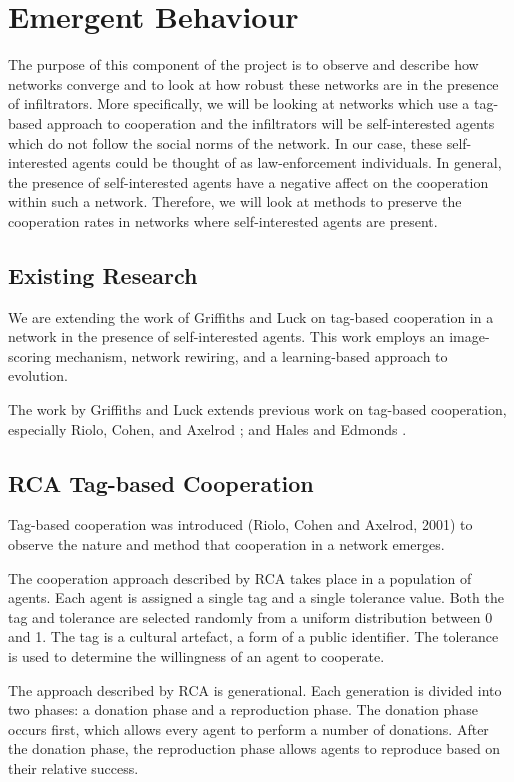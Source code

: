 \section{Emergent Behaviour}

The purpose of this component of the project is to observe and
describe how networks converge and to look at how robust these
networks are in the presence of infiltrators.  More specifically,
we will be looking at networks which use a tag-based approach to
cooperation and the infiltrators will be self-interested agents
which do not follow the social norms of the network.  In our case,
these self-interested agents could be thought of as law-enforcement
individuals.  In general, the presence of self-interested agents
have a negative affect on the cooperation within such a network.
Therefore, we will look at methods to preserve the cooperation rates
in networks where self-interested agents are present.

\subsection{Existing Research}

We are extending the work of Griffiths and Luck \cite{aamas2010} on tag-based
cooperation in a network in the presence of self-interested agents.
This work employs an image-scoring mechanism, network rewiring, and
a learning-based approach to evolution.

The work by Griffiths and Luck extends previous work on tag-based
cooperation, especially Riolo, Cohen, and Axelrod \cite{rca}; and Hales
and Edmonds \cite{he}.

\subsection{RCA Tag-based Cooperation}

Tag-based cooperation was introduced (Riolo, Cohen and Axelrod,
2001) to observe the nature and method that cooperation in a network
emerges.

The cooperation approach described by RCA takes place in a population
of agents.  Each agent is assigned a single tag and a single tolerance
value.  Both the tag and tolerance are selected randomly from a
uniform distribution between 0 and 1.
The tag is a cultural artefact, a form of a public identifier.
The tolerance is used to determine the willingness of an agent to cooperate.

The approach described by RCA is generational.  Each generation is
divided into two phases: a donation phase and a reproduction phase.
The donation phase occurs first, which allows every agent to perform
a number of donations.  After the donation phase, the reproduction
phase allows agents to reproduce based on their relative success.

